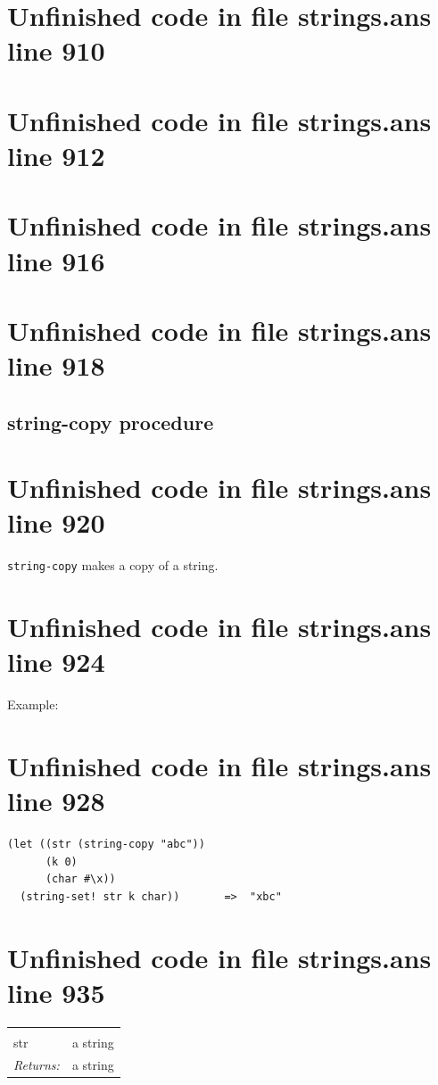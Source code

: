 \documentclass[twoside,9pt]{report}
\begin{document}
\section{Unfinished code in file strings.ans line 910}
\section{Unfinished code in file strings.ans line 912}
\section{Unfinished code in file strings.ans line 916}
\section{Unfinished code in file strings.ans line 918}
\subsection{string-copy procedure}
\label{string-copy-procedure}
\section{Unfinished code in file strings.ans line 920}


\texttt{string-copy} makes a copy of a string.

\section{Unfinished code in file strings.ans line 924}


Example:

\section{Unfinished code in file strings.ans line 928}
\begin{verbatim}
(let ((str (string-copy "abc"))
      (k 0)
      (char #\x))
  (string-set! str k char))       =>  "xbc"
\end{verbatim}
\section{Unfinished code in file strings.ans line 935}
\noindent\begin{tabular}{ |p{1.9cm} p{8cm}| }
\hline
\rowcolor[HTML]{CCCCCC} \multicolumn{2}{|l|}{\bf string-copy (public)} \\
str & a string \\
\textit{Returns:} & a string \\
\hline
\end{tabular}
\end{document}
